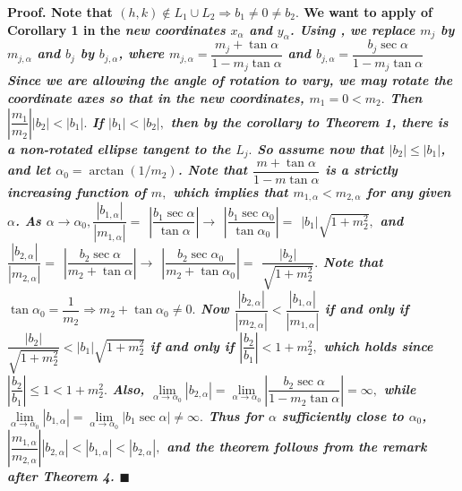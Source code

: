 \bf Proof. \rm Note that $(h,k)\notin L_{1}\cup L_{2}\Rightarrow b_{1}\neq 0\neq b_{2}.$ We want to apply  of Corollary 1 in the \it new \rm coordinates $x_{\alpha }$ and $y_{\alpha }$. Using  , we replace $m_{j}$ by $m_{j,\alpha }$ and $b_{j}$ by $b_{j,\alpha }$, where  $m_{j,\alpha }=\dfrac{m_{j}+\tan \alpha }{1-m_{j}\tan \alpha }$ and $b_{j,\alpha }=\dfrac{b_{j}\sec \alpha }{1-m_{j}\tan \alpha }$ Since we are allowing the angle of rotation to vary, we may rotate the coordinate axes so that in the new coordinates, $m_{1}=0<m_{2}.$ Then $\left| \dfrac{m_{1}}{m_{2}}\right| \left| b_{2}\right| <\left| b_{1}\right| .$ If $\left| b_{1}\right| <\left| b_{2}\right| ,$ then by the corollary to Theorem 1, there is a non-rotated ellipse tangent to the $L_{j}.$ So assume now that $\left| b_{2}\right| \leq \left| b_{1}\right| $, and let $\alpha _{0}=\arctan (1/m_{2})$. Note that $\dfrac{m+\tan \alpha }{1-m\tan \alpha }$ is a strictly increasing function of $m,$ which implies that $m_{1,\alpha }<m_{2,\alpha }$ for any given $\alpha $. As $\alpha \rightarrow \alpha _{0},\dfrac{\left| b_{1,\alpha }\right| }{\left| m_{1,\alpha }\right| }=$ $\left| \dfrac{b_{1}\sec \alpha }{\tan \alpha }\right| \rightarrow $ $\left| \dfrac{b_{1}\sec \alpha _{0}}{\tan \alpha _{0}}\right| =$ $\left| b_{1}\right| \sqrt{1+m_{2}^{2}},$ and $\dfrac{\left| b_{2,\alpha }\right| }{\left| m_{2,\alpha }\right| }=$ $\left| \dfrac{b_{2}\sec \alpha }{m_{2}+\tan \alpha }\right| \rightarrow $ $\left| \dfrac{b_{2}\sec \alpha _{0}}{m_{2}+\tan \alpha _{0}}\right| =$ $\dfrac{\left| b_{2}\right| }{\sqrt{1+m_{2}^{2}}}.$ Note that $\tan \alpha _{0}=\dfrac{1}{m_{2}}\Rightarrow m_{2}+\tan \alpha _{0}\neq 0.$ Now $\dfrac{\left| b_{2,\alpha }\right| }{\left| m_{2,\alpha }\right| }<\dfrac{\left| b_{1,\alpha }\right| }{\left| m_{1,\alpha }\right| }$ if and only if $\dfrac{\left| b_{2}\right| }{\sqrt{1+m_{2}^{2}}}<\left| b_{1}\right| \sqrt{1+m_{2}^{2}}$ if and only if $\left| \dfrac{b_{2}}{b_{1}}\right| <1+m_{2}^{2},$ which holds since $\left| \dfrac{b_{2}}{b_{1}}\right| \leq 1<1+m_{2}^{2}.$ Also, $\lim\limits_{\alpha \rightarrow \alpha _{0}}\left| b_{2,\alpha }\right| =\lim\limits_{\alpha \rightarrow \alpha _{0}}\left| \dfrac{b_{2}\sec \alpha }{1-m_{2}\tan \alpha }\right| =\infty ,$ while $\lim\limits_{\alpha \rightarrow \alpha _{0}}\left| b_{1,\alpha }\right| =\lim\limits_{\alpha \rightarrow \alpha _{0}}\left| b_{1}\sec \alpha \right| \neq \infty .$ Thus for $\alpha $ sufficiently close to $\alpha _{0}$, $\left| \dfrac{m_{1,\alpha }}{m_{2,\alpha }}\right| \left| b_{2,\alpha }\right| <\left| b_{1,\alpha }\right| <\left| b_{2,\alpha }\right| ,$ and the theorem follows from the remark after Theorem 4.  $\blacksquare$ 

